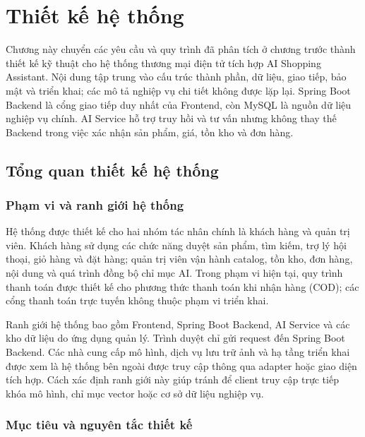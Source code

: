 
\section{Thiết kế hệ thống}

Chương này chuyển các yêu cầu và quy trình đã phân tích ở chương trước thành thiết kế kỹ thuật cho hệ thống thương mại điện tử tích hợp AI Shopping Assistant. Nội dung tập trung vào cấu trúc thành phần, dữ liệu, giao tiếp, bảo mật và triển khai; các mô tả nghiệp vụ chi tiết không được lặp lại. Spring Boot Backend là cổng giao tiếp duy nhất của Frontend, còn MySQL là nguồn dữ liệu nghiệp vụ chính. AI Service hỗ trợ truy hồi và tư vấn nhưng không thay thế Backend trong việc xác nhận sản phẩm, giá, tồn kho và đơn hàng.

\subsection{Tổng quan thiết kế hệ thống}

\subsubsection{Phạm vi và ranh giới hệ thống}

Hệ thống được thiết kế cho hai nhóm tác nhân chính là khách hàng và quản trị viên. Khách hàng sử dụng các chức năng duyệt sản phẩm, tìm kiếm, trợ lý hội thoại, giỏ hàng và đặt hàng; quản trị viên vận hành catalog, tồn kho, đơn hàng, nội dung và quá trình đồng bộ chỉ mục AI. Trong phạm vi hiện tại, quy trình thanh toán được thiết kế cho phương thức thanh toán khi nhận hàng (COD); các cổng thanh toán trực tuyến không thuộc phạm vi triển khai.

Ranh giới hệ thống bao gồm Frontend, Spring Boot Backend, AI Service và các kho dữ liệu do ứng dụng quản lý. Trình duyệt chỉ gửi request đến Spring Boot Backend. Các nhà cung cấp mô hình, dịch vụ lưu trữ ảnh và hạ tầng triển khai được xem là hệ thống bên ngoài được truy cập thông qua adapter hoặc giao diện tích hợp. Cách xác định ranh giới này giúp tránh để client truy cập trực tiếp khóa mô hình, chỉ mục vector hoặc cơ sở dữ liệu nghiệp vụ.

\subsubsection{Mục tiêu và nguyên tắc thiết kế}

